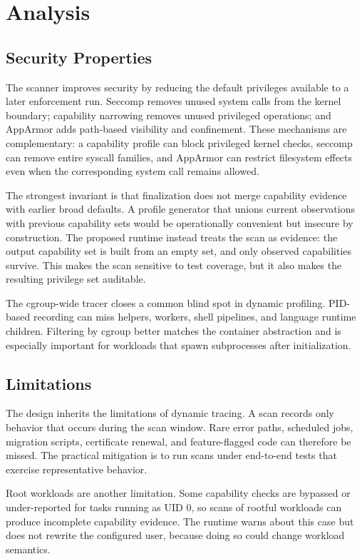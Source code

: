 \documentclass[runningheads]{llncs}
\begin{document}
\section{Analysis}\label{sec:analysis}

\subsection{Security Properties}

The scanner improves security by reducing the default privileges available to a later enforcement run. Seccomp removes unused system calls from the kernel boundary; capability narrowing removes unused privileged operations; and AppArmor adds path-based visibility and confinement. These mechanisms are complementary: a capability profile can block privileged kernel checks, seccomp can remove entire syscall families, and AppArmor can restrict filesystem effects even when the corresponding system call remains allowed.

The strongest invariant is that finalization does not merge capability evidence with earlier broad defaults. A profile generator that unions current observations with previous capability sets would be operationally convenient but insecure by construction. The proposed runtime instead treats the scan as evidence: the output capability set is built from an empty set, and only observed capabilities survive. This makes the scan sensitive to test coverage, but it also makes the resulting privilege set auditable.

The cgroup-wide tracer closes a common blind spot in dynamic profiling. PID-based recording can miss helpers, workers, shell pipelines, and language runtime children. Filtering by cgroup better matches the container abstraction and is especially important for workloads that spawn subprocesses after initialization.

\subsection{Limitations}

The design inherits the limitations of dynamic tracing. A scan records only behavior that occurs during the scan window. Rare error paths, scheduled jobs, migration scripts, certificate renewal, and feature-flagged code can therefore be missed. The practical mitigation is to run scans under end-to-end tests that exercise representative behavior.

Root workloads are another limitation. Some capability checks are bypassed or under-reported for tasks running as UID 0, so scans of rootful workloads can produce incomplete capability evidence. The runtime warns about this case but does not rewrite the configured user, because doing so could change workload semantics.
\end{document}
